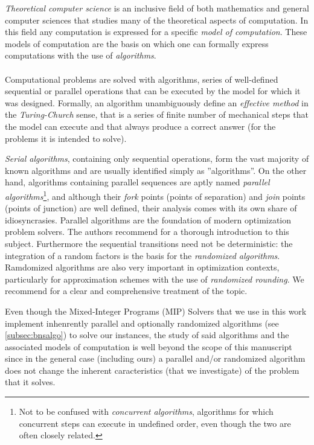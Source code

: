 	\emph{Theoretical computer science} is an inclusive field of both mathematics and general computer sciences that studies many of the theoretical aspects of computation.
	In this field any computation is expressed for a specific \emph{model of computation}.
	These models of computation are the basis on which one can formally express computations with the use of \emph{algorithms}.

	\paragraph{}
	Computational problems are solved with algorithms, series of well-defined sequential or parallel operations that can be executed by the model for which it was designed.
	Formally, an algorithm unambiguously define an \emph{effective method} in the \emph{Turing-Church} sense, that is a series of finite number of mechanical steps that the model can execute and that always produce a correct answer (for the problems it is intended to solve).

	\emph{Serial algorithms}, containing only sequential operations, form the vast majority of known algorithms and are usually identified simply as ''algorithms''.
	On the other hand, algorithms containing parallel sequences are aptly named \emph{parallel algorithms}\footnote{Not to be confused with \emph{concurrent algorithms}, algorithms for which concurrent steps can execute in undefined order, even though the two are often closely related.}, and although their \emph{fork} points (points of separation) and \emph{join} points (points of junction) are well defined, their analysis comes with its own share of idiosyncrasies.
	Parallel algorithms are the foundation of modern optimization problem solvers.
	The authors recommend \parencite{jada1992introduction} for a thorough introduction to this subject.
	Furthermore the sequential transitions need not be deterministic: the integration of a random factors is the basis for the \emph{randomized algorithms}.
	Ramdomized algorithms are also very important in optimization contexts, particularly for approximation schemes with the use of \emph{randomized rounding}.
	We recommend \parencite[Chapters~5 and 6]{williamson2011design} for a clear and comprehensive treatment of the topic.

	Even though the Mixed-Integer Programs (MIP) Solvers that we use in this work implement inhenrently parallel and optionally randomized algorithms (see \cref{subsec:bnsalgo}) to solve our instances, the study of said algorithms and the associated models of computation is well beyond the scope of this manuscript since in the general case (including ours) a parallel and/or randomized algorithm does not change the inherent caracteristics (that we investigate) of the problem that it solves.

